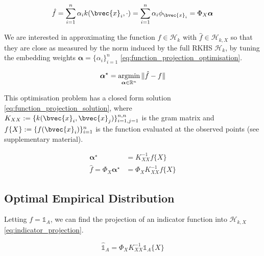 \documentclass[twoside]{article} \usepackage{aistats2017}
\newcommand{\argmin}{\operatornamewithlimits{argmin}}
\newcommand{\ds}[1]{{#1}}
\begin{document}
		\begin{equation}
			\hat{f} = \sum_{i = 1}^{n} \alpha_{i} k(\bvec{x}_{i}, \cdot) = \sum_{i = 1}^{n} \alpha_{i} \phi_{\bvec{x}_{i}} = \Phi_{\ds{X}} \bm{\alpha}
		\label{eq:function_projection}
		\end{equation}
	
		We are interested in approximating the function $f \in \mathcal{H}_{k}$ with $\hat{f} \in \mathcal{H}_{k, \ds{X}}$ so that they are close as measured by the norm induced by the full RKHS $\mathcal{H}_{k}$, by tuning the embedding weights $\bm{\alpha} = \{\alpha_{i}\}_{i = 1}^{n}$ \eqref{eq:function_projection_optimisation}.
			
		\begin{equation}
			\bm{\alpha}^{\star} = \argmin_{\bm{\alpha} \in \mathbb{R}^{n}} \Vert \hat{f} - f \Vert
		\label{eq:function_projection_optimisation}
		\end{equation}
		
		This optimisation problem has a closed form solution \eqref{eq:function_projection_solution}, where $K_{\ds{X} \ds{X}} := \{k(\bvec{x}_{i}, \bvec{x}_{j})\}_{i = 1, j = 1}^{n, n}$ is the gram matrix and $f\{\ds{X}\} := \{f(\bvec{x}_{i})\}_{i = 1}^{n}$ is the function evaluated at the observed points (see supplementary material).
		
		\begin{equation}
			\begin{aligned}
				\bm{\alpha}^{\star} &= K_{\ds{X} \ds{X}}^{-1} f\{\ds{X}\} \\
				\hat{f} = \Phi_{\ds{X}} \bm{\alpha}^{\star} &= \Phi_{\ds{X}} K_{\ds{X} \ds{X}}^{-1} f\{\ds{X}\}
			\end{aligned}
		\label{eq:function_projection_solution}
		\end{equation}
		
	\subsection{Optimal Empirical Distribution}
				
		Letting $f = \mathbb{1}_{A}$, we can find the projection of an indicator function into $\mathcal{H}_{k, \ds{X}}$ \eqref{eq:indicator_projection}.
		
		\begin{equation}
			\hat{\mathbb{1}}_{A} = \Phi_{\ds{X}} K_{\ds{X} \ds{X}}^{-1} \mathbb{1}_{A}\{\ds{X}\}
		\label{eq:indicator_projection}
		\end{equation}
		
\end{document}
